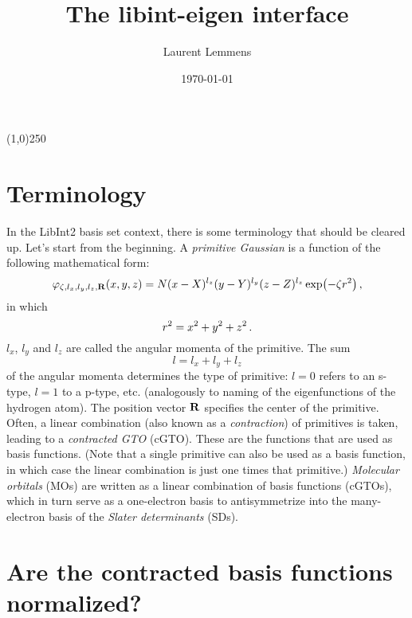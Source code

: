 \documentclass[12pt]{article}
\title{The libint-eigen interface}
\author{Laurent Lemmens}
\date{\today \hspace{6pt} \currenttime}
\begin{document}
\maketitle

\begin{center}
\line(1,0){250}
\end{center}

\tableofcontents
\newpage



\section{Terminology}
    In the LibInt2 basis set context, there is some terminology that should be cleared up. Let's start from the beginning. A \textit{primitive Gaussian} is a function of the following mathematical form:
    \begin{equation}
        \varphi_{\zeta, l_x, l_y, l_z, \vb{R}}(x, y, z) = N (x - X)^{l_z} (y - Y)^{l_y} (z - Z)^{l_z} \exp(-\zeta r^2) \thinspace ,
    \end{equation}
    in which
    \begin{equation}
        r^2 = x^2 + y^2 + z^2 \thinspace .
    \end{equation}
    $l_x$, $l_y$ and $l_z$ are called the angular momenta of the primitive. The sum
    \begin{equation}
        l = l_x + l_y + l_z
    \end{equation}
    of the angular momenta determines the type of primitive: $l=0$ refers to an s-type, $l=1$ to a p-type, etc. (analogously to naming of the eigenfunctions of the hydrogen atom). The position vector $\vb{R}$ specifies the center of the primitive. \\

    Often, a linear combination (also known as a \textit{contraction}) of primitives is taken, leading to a \textit{contracted GTO} (cGTO). These are the functions that are used as basis functions. (Note that a single primitive can also be used as a basis function, in which case the linear combination is just one times that primitive.) \textit{Molecular orbitals} (MOs) are written as a linear combination of basis functions (cGTOs), which in turn serve as a one-electron basis to antisymmetrize into the many-electron basis of the \textit{Slater determinants} (SDs). \cite{jensen2007}


\section{Are the contracted basis functions normalized?}
\end{document}

